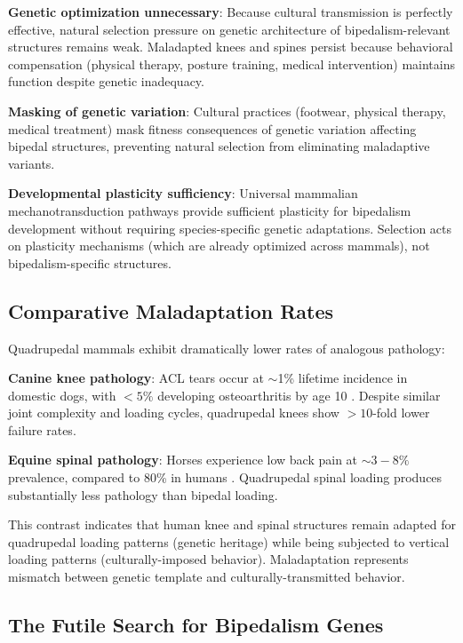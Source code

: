 \documentclass[12pt,a4paper]{article}
\begin{document}
\textbf{Genetic optimization unnecessary}: Because cultural transmission is perfectly effective, natural selection pressure on genetic architecture of bipedalism-relevant structures remains weak. Maladapted knees and spines persist because behavioral compensation (physical therapy, posture training, medical intervention) maintains function despite genetic inadequacy.

\textbf{Masking of genetic variation}: Cultural practices (footwear, physical therapy, medical treatment) mask fitness consequences of genetic variation affecting bipedal structures, preventing natural selection from eliminating maladaptive variants.

\textbf{Developmental plasticity sufficiency}: Universal mammalian mechanotransduction pathways provide sufficient plasticity for bipedalism development without requiring species-specific genetic adaptations. Selection acts on plasticity mechanisms (which are already optimized across mammals), not bipedalism-specific structures.

\subsection{Comparative Maladaptation Rates}

Quadrupedal mammals exhibit dramatically lower rates of analogous pathology:

\textbf{Canine knee pathology}: ACL tears occur at $\sim$1\% lifetime incidence in domestic dogs, with $<5\%$ developing osteoarthritis by age 10 \citep{witsberger2008prevalence}. Despite similar joint complexity and loading cycles, quadrupedal knees show $>10$-fold lower failure rates.

\textbf{Equine spinal pathology}: Horses experience low back pain at $\sim 3-8\%$ prevalence, compared to 80\% in humans \citep{jeffcott1980disorders}. Quadrupedal spinal loading produces substantially less pathology than bipedal loading.

This contrast indicates that human knee and spinal structures remain adapted for quadrupedal loading patterns (genetic heritage) while being subjected to vertical loading patterns (culturally-imposed behavior). Maladaptation represents mismatch between genetic template and culturally-transmitted behavior.

\subsection{The Futile Search for Bipedalism Genes}
\end{document}

